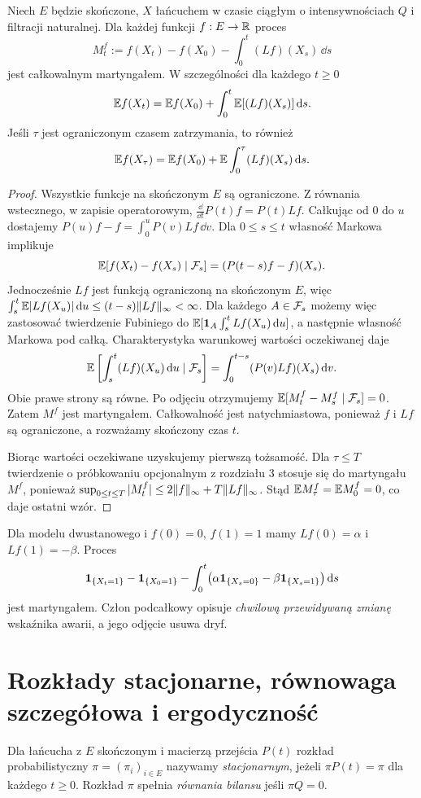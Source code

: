 \begin{twierdzenie}
\label{thm:dynkin}
Niech $E$ będzie skończone, $X$ łańcuchem w czasie
ciągłym o intensywnościach $Q$ i filtracji naturalnej.
Dla każdej funkcji $f:E\to\mathbb{R}$ proces
\[
M_t^f:=f(X_t)-f(X_0)-\int_0^t (Lf)(X_s)\,\dd s
\]
jest całkowalnym martyngałem.
W szczególności dla każdego $t\ge0$
\[
\mathbb{E} f(X_t)=\mathbb{E} f(X_0)+
\int_0^t\mathbb{E}[(Lf)(X_s)]\,\mathrm{d} s.
\]
Jeśli $\tau$ jest ograniczonym czasem zatrzymania,
to również
\[
\mathbb{E} f(X_\tau)=\mathbb{E} f(X_0)+
\mathbb{E}\int_0^\tau (Lf)(X_s)\,\mathrm{d} s.
\]
\end{twierdzenie}
\begin{proof}
Wszystkie funkcje na skończonym $E$ są ograniczone.
Z równania wstecznego, w zapisie operatorowym,
$\frac{\dd}{\dd t}P(t)f=P(t)Lf$.
Całkując od $0$ do $u$ dostajemy
$P(u)f-f=\int_0^u P(v)Lf\,\dd v$.
Dla $0\le s\le t$ własność Markowa implikuje
\[
\mathbb{E}[f(X_t)-f(X_s)\mid\mathcal{F}_s]
=(P(t-s)f-f)(X_s).
\]
Jednocześnie $Lf$ jest funkcją ograniczoną na skończonym $E$, więc
$\int_s^t\mathbb{E}|Lf(X_u)|\,\mathrm{d} u\le(t-s)\lVert Lf\rVert_\infty<\infty$.
Dla każdego $A\in\mathcal{F}_s$ możemy więc zastosować twierdzenie
Fubiniego do $\mathbb{E}[\mathbf{1}_{A}\int_s^t Lf(X_u)\,\mathrm{d} u]$,
a następnie własność Markowa pod całką. Charakterystyka
warunkowej wartości oczekiwanej daje
\[
\mathbb{E}\left[\int_s^t(Lf)(X_u)\,\mathrm{d} u\mid\mathcal{F}_s\right]
=\int_0^{t-s}(P(v)Lf)(X_s)\,\mathrm{d} v.
\]
Obie prawe strony są równe. Po odjęciu otrzymujemy
$\mathbb{E}[M_t^f-M_s^f\mid\mathcal{F}_s]=0$.
Zatem $M^f$ jest martyngałem. Całkowalność jest
natychmiastowa, ponieważ $f$ i $Lf$ są ograniczone,
a rozważamy skończony czas $t$.

Biorąc wartości oczekiwane uzyskujemy pierwszą tożsamość.
Dla $\tau\le T$ twierdzenie o próbkowaniu opcjonalnym
z rozdziału 3 stosuje się do martyngału $M^f$, ponieważ
$\sup_{0\le t\le T}|M_t^f|\le2\lVert f\rVert_\infty+T\lVert Lf\rVert_\infty$.
Stąd $\mathbb{E} M_\tau^f=\mathbb{E} M_0^f=0$, co daje ostatni wzór.
\end{proof}

\begin{przyklad}
Dla modelu dwustanowego i $f(0)=0$, $f(1)=1$ mamy
$Lf(0)=\alpha$ i $Lf(1)=-\beta$.
Proces
\[
\mathbf{1}_{\{X_t=1\}}-\mathbf{1}_{\{X_0=1\}}
-\int_0^t\bigl(\alpha\mathbf{1}_{\{X_s=0\}}
-\beta\mathbf{1}_{\{X_s=1\}}\bigr)\,\mathrm{d} s
\]
jest martyngałem. Człon podcałkowy opisuje
\emph{chwilową przewidywaną zmianę} wskaźnika awarii,
a jego odjęcie usuwa dryf.
\end{przyklad}

\section{Rozkłady stacjonarne, równowaga szczegółowa i ergodyczność}
\begin{definicja}
Dla łańcucha z $E$ skończonym i macierzą przejścia
$P(t)$ rozkład probabilistyczny $\pi=(\pi_i)_{i\in E}$
nazywamy \emph{stacjonarnym}, jeżeli
$\pi P(t)=\pi$ dla każdego $t\ge0$.
Rozkład $\pi$ spełnia \emph{równania bilansu} jeśli
$\pi Q=0$.
\end{definicja}

